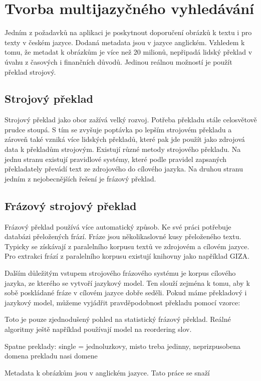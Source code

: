 \chapter{Tvorba multijazyčného vyhledávání}

Jedním z požadavků na aplikaci je poskytnout doporučení obrázků k textu i pro texty v českém jazyce. Dodaná metadata jsou v jazyce anglickém. Vzhledem k tomu, že metadat k obrázkům je více než 20 milionů, nepřipadá lidský překlad v úvahu z časových i finančních důvodů. Jedinou reálnou možností je použít překlad strojový.

\section{Strojový překlad}

Strojový překlad jako obor zažívá velký rozvoj. Potřeba překladu stále celosvětově prudce stoupá. S tím se zvyšuje poptávka po lepším strojovém překladu a zároveň také vzniká více lidských překladů, které pak jde použít jako zdrojová data k překladům strojovým. Existují různé metody strojového překladu. Na jednu stranu existují pravidlové systémy, které podle pravidel zapsaných překladately převádí text ze zdrojového do cílového jazyka. Na druhou stranu jedním z nejobecnějších řešení je frázový překlad.

\section{Frázový strojový překlad}

Frázový překlad používá více automatický způsob. Ke své práci potřebuje databázi přeložených frází. Fráze jsou několikaslovné kusy přeloženého textu. Typicky se získávají z paralelního korpusu textů ve zdrojovém a cílovém jazyce. Pro extrakci frází z paralelního korpusu existují knihovny jako například GIZA.

Dalším důležitým vstupem strojového frázového systému je korpus cílového jazyka, ze kterého se vytvoří jazykový model. Ten slouží zejména k tomu, aby k sobě poskládané fráze v cílovém jazyce dobře seděli. Pokud máme překladový i jazykový model, můžeme vyjádřit pravděpodobnost překladu pomocí vzorce:

Toto je pouze zjednodušený pohled na statistický frázový překlad. Reálné algoritmy ještě například používají model na reordering slov.






Spatne preklady: single = jednoluzkovy, misto treba jedinny, neprizpusobena domena prekladu nasi domene

Metadata k obrázkům jsou v anglickém jazyce. Tato práce se snaží 